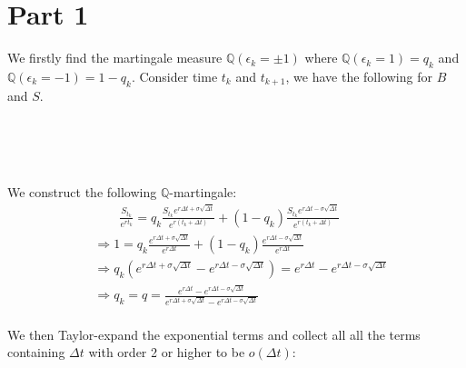 \documentclass[12pt, letterpaper]{article}
\begin{document}
\section*{Part 1}
We firstly find the martingale measure $\mathbb{Q}(\epsilon_k = \pm 1)$ where $\mathbb{Q}(\epsilon_k =1) = q_k$ and $\mathbb{Q}(\epsilon_k =-1) = 1-q_k$. Consider 
time $t_k$ and $t_{k+1}$, we have the following for $B$ and $S$. \\ \\ 
\\
\\
We construct the following $\mathbb{Q}$-martingale:
\begin{align*}
&\qquad \frac{S_{t_k}}{e^{rt_k}} = q_k\frac{S_{t_k}e^{r\Delta t + \sigma \sqrt{\Delta t}}}{e^{r(t_k+\Delta t)}} + (1-q_k)\frac{S_{t_k}e^{r\Delta t - \sigma \sqrt{\Delta t}}}{e^{r(t_k+\Delta t)}}\\
&\Rightarrow 1 = q_k\frac{e^{r\Delta t + \sigma \sqrt{\Delta t}}}{e^{r\Delta t}} + (1-q_k) \frac{e^{r\Delta t - \sigma \sqrt{\Delta t}}}{e^{r\Delta t}} \\
&\Rightarrow q_k(e^{r\Delta t + \sigma \sqrt{\Delta t}} - e^{r\Delta t - \sigma \sqrt{\Delta t}}) = e^{r\Delta t} - e^{r\Delta t - \sigma \sqrt{\Delta t}} \\
&\Rightarrow q_k = q = \frac{e^{r\Delta t} - e^{r\Delta t - \sigma \sqrt{\Delta t}}}{e^{r\Delta t + \sigma \sqrt{\Delta t}} - e^{r\Delta t - \sigma \sqrt{\Delta t}}} \tag*{As $q_k$ does not depend on $k$}
\end{align*} 
\\
We then Taylor-expand the exponential terms and collect all all the terms containing $\Delta t$ with order 2 or higher to be $o(\Delta t)$:
\end{document}
